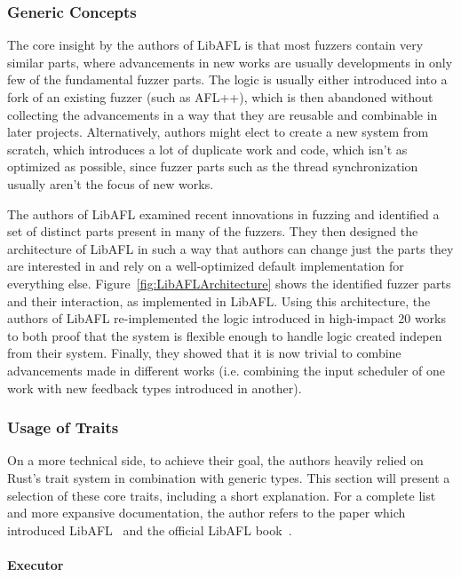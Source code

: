 \documentclass{article}
\let\savedCite=\cite
\renewcommand{\cite}{\unskip~\savedCite}
\let\savedRef=\ref
\renewcommand{\ref}{\unskip~\savedRef}
\begin{document}
\begin{multicols}{2}
    \subsubsection{Generic Concepts}
    The core insight by the authors of LibAFL is that most fuzzers contain very similar parts, where advancements in new works are usually developments in only few of the fundamental fuzzer parts. The logic is usually either introduced into a fork of an existing fuzzer (such as AFL++), which is then abandoned without collecting the advancements in a way that they are reusable and combinable in later projects. Alternatively, authors might elect to create a new system from scratch, which introduces a lot of duplicate work and code, which isn't as optimized as possible, since fuzzer parts such as the thread synchronization usually aren't the focus of new works.

    The authors of LibAFL examined recent innovations in fuzzing and identified a set of distinct parts present in many of the fuzzers. They then designed the architecture of LibAFL in such a way that authors can change just the parts they are interested in and rely on a well-optimized default implementation for everything else. Figure\ref{fig:LibAFLArchitecture} shows the identified fuzzer parts and their interaction, as implemented in LibAFL. Using this architecture, the authors of LibAFL re-implemented the logic introduced in high-impact 20 works to both proof that the system is flexible enough to handle logic created indepen from their system. Finally, they showed that it is now trivial to combine advancements made in different works (i.e. combining the input scheduler of one work with new feedback types introduced in another).

    \subsubsection{Usage of Traits}
    \label{LibAFLTraits}

    On a more technical side, to achieve their goal, the authors heavily relied on Rust's trait system in combination with generic types. This section will present a selection of these core traits, including a short explanation. For a complete list and more expansive documentation, the author refers to the paper which introduced LibAFL\cite{LibAFL} and the official LibAFL book\cite{LibAFLBook}.

    \paragraph{Executor}


\end{multicols}
\end{document}
